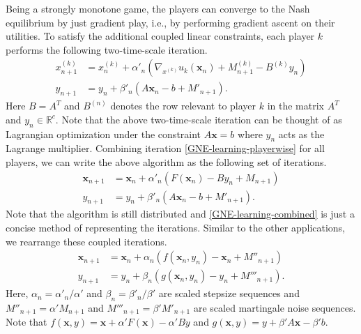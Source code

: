 \documentclass[letterpaper, 10 pt, conference]{ieeeconf}  %
\theoremstyle{definition}
\theoremstyle{plain}
\newcommand{\RR}{\mathbb{R}}
\newcommand{\xx}{\mathbf{x}}
\begin{document}
Being a strongly monotone game, the players can converge to the Nash equilibrium by just gradient play, i.e., by performing gradient ascent on their utilities. To satisfy the additional coupled linear constraints, each player $k$ performs the following two-time-scale iteration.
\begin{equation}\label{GNE-learning-playerwise}
    \begin{aligned}
x^{(k)}_{n+1}&=x^{(k)}_n+\alpha'_n (\nabla_{x^{(k)}}u_k(\xx_n)+M^{(k)}_{n+1}-B^{(k)}y_n)\\
y_{n+1}&=y_n+\beta'_n (A\xx_n-b+M'_{n+1}).
\end{aligned}
\end{equation}
Here $B=A^T$ and $B^{(n)}$ denotes the row relevant to player $k$ in the matrix $A^T$ and $y_n\in\RR^c$. Note that the above two-time-scale iteration can be thought of as Lagrangian optimization under the constraint $A\xx=b$ where $y_n$ acts as the Lagrange multiplier. Combining iteration \eqref{GNE-learning-playerwise} for all players, we can write the above algorithm as the following set of iterations. 
\begin{equation}\label{GNE-learning-combined}
    \begin{aligned}
\xx_{n+1}&=\xx_n+\alpha'_n (F(\xx_n)-By_n+M_{n+1})\\
y_{n+1}&=y_n+\beta'_n (A\xx_n-b+M'_{n+1}).
\end{aligned}
\end{equation}
Note that the algorithm is still distributed and \eqref{GNE-learning-combined} is just a concise method of representing the iterations. Similar to the other applications, we rearrange these coupled iterations.
\begin{equation}\label{GNE-learning-iter}
    \begin{aligned}
\xx_{n+1}&=\xx_n+\alpha_n (f(\xx_n,y_n)-\xx_n+M''_{n+1})\\
y_{n+1}&=y_n+\beta_n (g(\xx_n,y_n)-y_n+M'''_{n+1}).
\end{aligned}
\end{equation}
Here, $\alpha_n=\alpha'_n/\alpha'$ and $\beta_n=\beta'_n/\beta'$ are scaled stepsize sequences and $M''_{n+1}=\alpha'M_{n+1}$ and $M'''_{n+1}=\beta'M'_{n+1}$ are scaled martingale noise sequences. Note that $f(\xx,y)=\xx+\alpha'F(\xx)-\alpha'By$ and $g(\xx,y)=y+\beta'A\xx-\beta'b$.
\end{document}
